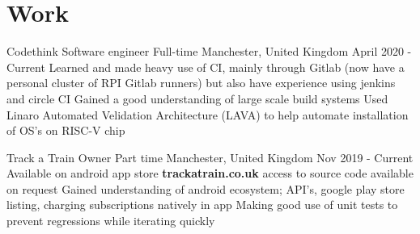\documentclass{my_cv}
\begin{document}
\section{Work}

\workDetails
{Codethink}
{Software engineer}
{Full-time}
{Manchester, United Kingdom}
{April 2020 - Current}
\workdetails
{Learned and made heavy use of CI, mainly through Gitlab (now have a personal cluster of RPI Gitlab runners) but also have experience using jenkins and circle CI}
{Gained a good understanding of large scale build systems}
{Used Linaro Automated Velidation Architecture (LAVA) to help automate installation of OS's on RISC-V chip}
\stopworkdetails

\workDetails
{Track a Train}
{Owner}
{Part time}
{Manchester, United Kingdom}
{Nov 2019 - Current}
\workdetails
{Available on android app store \textbf{trackatrain.co.uk} access to source code available on request}
{Gained understanding of android ecosystem; API's, google play store listing, charging subscriptions natively in app}
{Making good use of unit tests to prevent regressions while iterating quickly}
\stopworkdetails
\end{document}
